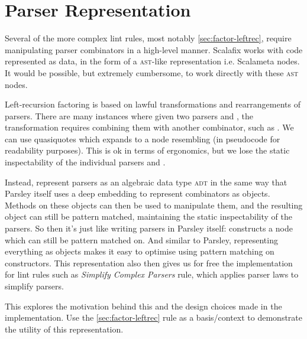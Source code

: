 \documentclass[../../main.tex]{subfiles}
\begin{document}
\section{Parser Representation}\label{sec:parser-representation}

Several of the more complex lint rules, most notably \cref{sec:factor-leftrec}, require manipulating parser combinators in a high-level manner.
Scalafix works with code represented as data, in the form of a \textsc{ast}-like representation i.e. Scalameta  nodes.
It would be possible, but extremely cumbersome, to work directly with these \textsc{ast} nodes.

Left-recursion factoring is based on lawful transformations and rearrangements of parsers.
There are many instances where given two parsers  and , the transformation requires combining them with another combinator, such as \scala{<*>}.
We can use quasiquotes  which expands to a  node resembling  (in pseudocode for readability purposes).
This is ok in terms of ergonomics, but we lose the static inspectability of the individual parsers  and .

Instead, represent parsers as an algebraic data type \textsc{adt} in the same way that Parsley itself uses a deep embedding to represent combinators as objects.
Methods on these objects can then be used to manipulate them, and the resulting object can still be pattern matched, maintaining the static inspectability of the parsers.
So then it's just like writing parsers in Parsley itself:  constructs a  node which can still be pattern matched on.
And similar to Parsley, representing everything as objects makes it easy to optimise using pattern matching on constructors.
This representation also then gives us for free the implementation for lint rules such as \emph{Simplify Complex Parsers} rule, which applies parser laws to simplify parsers.

This  explores the motivation behind this and the design choices made in the implementation.
Use the \cref{sec:factor-leftrec} rule as a basis/context to demonstrate the utility of this representation.
\end{document}
